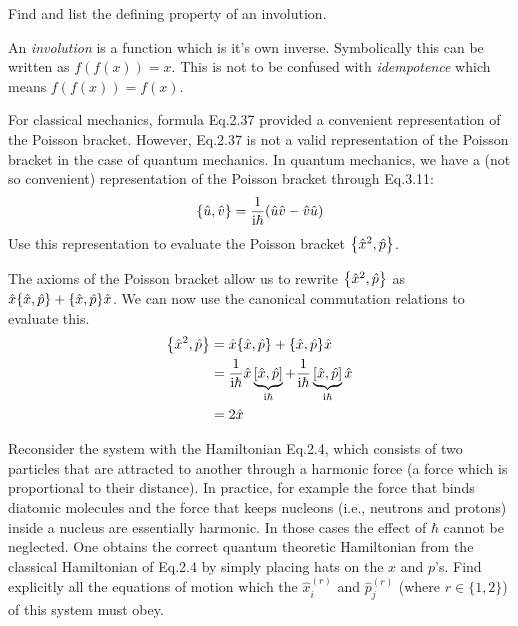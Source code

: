 \documentclass[boxes,pages]{homework}
\makeatletter
\newcommand{\iu}{\mathrm{i}}
\numberwithin{@problem}{section}
\makeatother
\begin{document}
\setcounter{section}{3}

\begin{problem}
Find and list the defining property of an involution.
\end{problem}

\begin{solution}
	An \emph{involution} is a function which is it's own inverse. Symbolically this can be written as $f(f(x)) = x$. This is not to be confused with \emph{idempotence} which means $f(f(x)) = f(x)$.
\end{solution}

\begin{problem}
For classical mechanics, formula Eq.2.37 provided a convenient representation of the Poisson bracket. However, Eq.2.37 is not a valid representation of the Poisson bracket in the case of quantum mechanics. In quantum mechanics, we have a (not so convenient) representation of the Poisson bracket through Eq.3.11:
\begin{equation*}
	\pb{\hat{u}}{\hat{v}} = \frac{1}{\iu\hbar}\qty(\hat{u}\hat{v} - \hat{v}\hat{u})
\end{equation*}
Use this representation to evaluate the Poisson bracket $\pb{\hat{x}^2}{\hat{p}}$.
\end{problem}

\begin{solution}
	The axioms of the Poisson bracket allow us to rewrite $\pb{\hat{x}^2}{\hat{p}}$ as $\hat{x}\pb{\hat{x}}{\hat{p}} + \pb{\hat{x}}{\hat{p}}\hat{x}$. We can now use the canonical commutation relations to evaluate this.
	\begin{align*}
		\pb{\hat{x}^2}{\hat{p}} & = \hat{x}\pb{\hat{x}}{\hat{p}} + \pb{\hat{x}}{\hat{p}}\hat{x}                                                                                         \\
		                        & = \frac{1}{\iu\hbar}\hat{x}\underbrace{\comm{\hat{x}}{\hat{p}}}_{\iu\hbar} + \frac{1}{\iu\hbar}\underbrace{\comm{\hat{x}}{\hat{p}}}_{\iu\hbar}\hat{x} \\
		                        & = 2\hat{x}
	\end{align*}
\end{solution}

\begin{problem}
Reconsider the system with the Hamiltonian Eq.2.4, which consists of two particles that are attracted to another through a harmonic force (a force which is proportional to their distance). In practice, for example the force that binds diatomic molecules and the force that keeps nucleons (i.e., neutrons and protons) inside a nucleus are essentially harmonic. In those cases the effect of $\hbar$ cannot be neglected. One obtains the correct quantum theoretic Hamiltonian from the classical Hamiltonian of Eq.2.4 by simply placing hats on the $x$ and $p$’s. Find explicitly all the equations of motion which the $\hat{x}_i^{(r)}$ and $\hat{p}_j^{(r)}$ (where $r\in \{1,2\}$) of this system must obey.
\end{problem}
\end{document}
